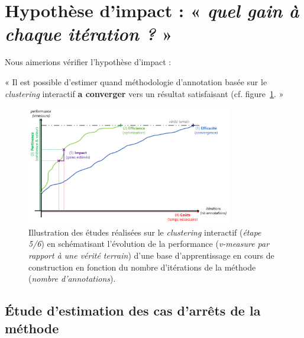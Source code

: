     \section{Hypothèse d'impact : « \textit{quel gain à chaque itération ?} »}
	\label{section:4.5-HYPOTHESE-IMPACT}
	
		Nous aimerions vérifier l'hypothèse d'impact :

		\begin{tcolorbox}[
			title=\textbf{Hypothèse d'impact},
			colback=gray!20,
			colframe=gray!50!black!75,
			width=\linewidth
		]
			« Il est possible d'estimer quand méthodologie d'annotation basée sur le \textit{clustering} interactif \textbf{a converger} vers un résultat satisfaisant (cf. figure~\ref{figure:HYPOTHESE-IMPACT}. »
			
			
			\begin{figure}[H]
				\centering
				\includegraphics[width=0.8\textwidth]{figures/hypotheses-05-impact}
				\caption{Illustration des études réalisées sur le \textit{clustering} interactif (\textit{étape 5/6}) en schématisant l'évolution de la performance (\textit{v-measure par rapport à une vérité terrain}) d'une base d'apprentissage en cours de construction en fonction du nombre d'itérations de la méthode (\textit{nombre d'annotations}).}
				\label{figure:HYPOTHESE-IMPACT}
			\end{figure}

		\end{tcolorbox}
		
		\subsection{Étude d'estimation des cas d'arrêts de la méthode}
		

